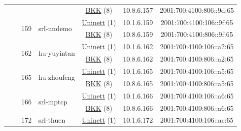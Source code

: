 \begin{small}
\begin{center}
\begin{longtable}{|c|c|c|c|c|c|c|c|}
  &  &  &  & \multicolumn{2}{|c|}{\tiny{\href{http://bkk.no}{BKK} (8)}} & \tiny{10.8.6.157} & \tiny{2001:700:4100:806::9d:65} \\* \cline{3-3}\cline{4-4}\cline{5-5}\cline{6-6}\cline{7-7}\cline{8-8}
  &  & \multirow{2}{*}{\tiny{159}} & \multicolumn{1}{|l|}{\multirow{2}{*}{\tiny{srl-nndemo}}} & \multicolumn{2}{|c|}{\tiny{\href{https://www.uninett.no}{Uninett} (1)}} & \tiny{10.1.6.159} & \tiny{2001:700:4100:106::9f:65} \\* \cline{5-5}\cline{6-6}\cline{7-7}\cline{8-8}
  &  &  &  & \multicolumn{2}{|c|}{\tiny{\href{http://bkk.no}{BKK} (8)}} & \tiny{10.8.6.159} & \tiny{2001:700:4100:806::9f:65} \\* \cline{3-3}\cline{4-4}\cline{5-5}\cline{6-6}\cline{7-7}\cline{8-8}
  &  & \multirow{2}{*}{\tiny{162}} & \multicolumn{1}{|l|}{\multirow{2}{*}{\tiny{hu-yuyintan}}} & \multicolumn{2}{|c|}{\tiny{\href{https://www.uninett.no}{Uninett} (1)}} & \tiny{10.1.6.162} & \tiny{2001:700:4100:106::a2:65} \\* \cline{5-5}\cline{6-6}\cline{7-7}\cline{8-8}
  &  &  &  & \multicolumn{2}{|c|}{\tiny{\href{http://bkk.no}{BKK} (8)}} & \tiny{10.8.6.162} & \tiny{2001:700:4100:806::a2:65} \\* \cline{3-3}\cline{4-4}\cline{5-5}\cline{6-6}\cline{7-7}\cline{8-8}
  &  & \multirow{2}{*}{\tiny{165}} & \multicolumn{1}{|l|}{\multirow{2}{*}{\tiny{hu-zhoufeng}}} & \multicolumn{2}{|c|}{\tiny{\href{https://www.uninett.no}{Uninett} (1)}} & \tiny{10.1.6.165} & \tiny{2001:700:4100:106::a5:65} \\* \cline{5-5}\cline{6-6}\cline{7-7}\cline{8-8}
  &  &  &  & \multicolumn{2}{|c|}{\tiny{\href{http://bkk.no}{BKK} (8)}} & \tiny{10.8.6.165} & \tiny{2001:700:4100:806::a5:65} \\* \cline{3-3}\cline{4-4}\cline{5-5}\cline{6-6}\cline{7-7}\cline{8-8}
  &  & \multirow{2}{*}{\tiny{166}} & \multicolumn{1}{|l|}{\multirow{2}{*}{\tiny{srl-mptcp}}} & \multicolumn{2}{|c|}{\tiny{\href{https://www.uninett.no}{Uninett} (1)}} & \tiny{10.1.6.166} & \tiny{2001:700:4100:106::a6:65} \\* \cline{5-5}\cline{6-6}\cline{7-7}\cline{8-8}
  &  &  &  & \multicolumn{2}{|c|}{\tiny{\href{http://bkk.no}{BKK} (8)}} & \tiny{10.8.6.166} & \tiny{2001:700:4100:806::a6:65} \\* \cline{3-3}\cline{4-4}\cline{5-5}\cline{6-6}\cline{7-7}\cline{8-8}
  &  & \multirow{2}{*}{\tiny{172}} & \multicolumn{1}{|l|}{\multirow{2}{*}{\tiny{srl-thuen}}} & \multicolumn{2}{|c|}{\tiny{\href{https://www.uninett.no}{Uninett} (1)}} & \tiny{10.1.6.172} & \tiny{2001:700:4100:106::ac:65} \\* \cline{5-5}\cline{6-6}\cline{7-7}\cline{8-8}

\end{longtable}
\end{center}
\end{small}
